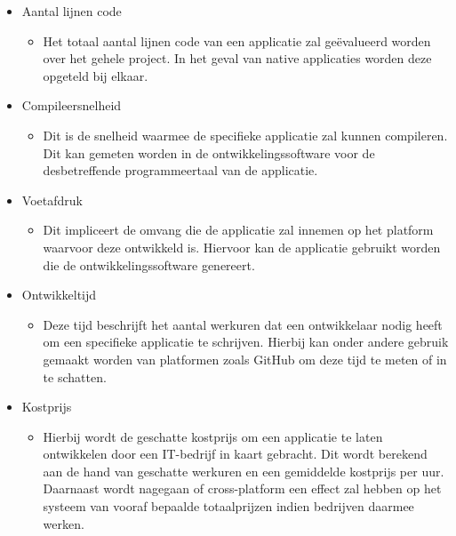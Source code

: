 \begin{itemize}
    \item Aantal lijnen code
    \begin{itemize}
        \item Het totaal aantal lijnen code van een applicatie zal geëvalueerd worden over het gehele project. In het geval van native applicaties worden deze opgeteld bij elkaar.
    \end{itemize}
    \item Compileersnelheid
    \begin{itemize}
        \item Dit is de snelheid waarmee de specifieke applicatie zal kunnen compileren. Dit kan gemeten worden in de ontwikkelingssoftware voor de desbetreffende programmeertaal van de applicatie.
    \end{itemize}
    \item Voetafdruk
    \begin{itemize}
        \item Dit impliceert de omvang die de applicatie zal innemen op het platform waarvoor deze ontwikkeld is. Hiervoor kan de applicatie gebruikt worden die de ontwikkelingssoftware genereert.
    \end{itemize}
    \item Ontwikkeltijd
    \begin{itemize}
        \item Deze tijd beschrijft het aantal werkuren dat een ontwikkelaar nodig heeft om een specifieke applicatie te schrijven. Hierbij kan onder andere gebruik gemaakt worden van platformen zoals GitHub om deze tijd te meten of in te schatten.
    \end{itemize}
    \item Kostprijs
    \begin{itemize}
        \item Hierbij wordt de geschatte kostprijs om een applicatie te laten ontwikkelen door een IT-bedrijf in kaart gebracht. Dit wordt berekend aan de hand van geschatte werkuren en een gemiddelde kostprijs per uur. Daarnaast wordt nagegaan of cross-platform een effect zal hebben op het systeem van vooraf bepaalde totaalprijzen indien bedrijven daarmee werken.
    \end{itemize}
\end{itemize}